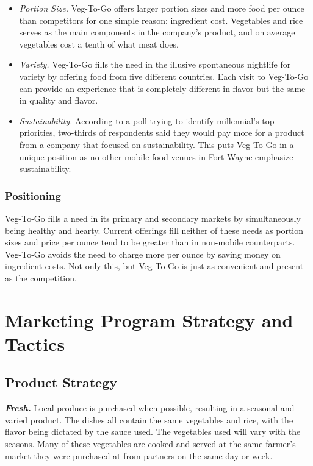 \documentclass[12pt, letterpaper]{article}
\newcommand{\companyname}{Veg-To-Go}
\begin{document}
\begin{itemize}
	\item \emph{Portion Size.}  \companyname{} offers larger portion sizes and more food per ounce than competitors for one simple reason: ingredient cost.  Vegetables and rice serves as the main components in the company's product, and on average vegetables cost a tenth of what meat does. \cite{costs}
	\item \emph{Variety.} \companyname{} fills the need in the illusive spontaneous nightlife for variety by offering food from five different countries.  Each visit to \companyname{} can provide an experience that is completely different in flavor but the same in quality and flavor.
	\item \emph{Sustainability.} According to a poll trying to identify millennial's top priorities, two-thirds of respondents said they would pay more for a product from a company that focused on sustainability. \cite{millennials} This puts \companyname{} in a unique position as no other mobile food venues in Fort Wayne emphasize sustainability.
\end{itemize}

\subsubsection{Positioning}
\companyname{} fills a need in its primary and secondary markets by simultaneously being healthy and hearty.  Current offerings fill neither of these needs as portion sizes and price per ounce tend to be greater than in non-mobile counterparts. \companyname{} avoids the need to charge more per ounce by saving money on ingredient costs.  Not only this, but \companyname{} is just as convenient and present as the competition.

\newpage

\section{Marketing Program Strategy and Tactics}
\subsection{Product Strategy}
\textbf{\emph{Fresh.}} Local produce is purchased when possible, resulting in a seasonal and varied product. The dishes  all contain the same vegetables and rice, with the flavor being dictated by the sauce used. The vegetables used will vary with the seasons. Many of these vegetables are cooked and served at the same farmer's market they were purchased at from partners on the same day or week.
\end{document}
